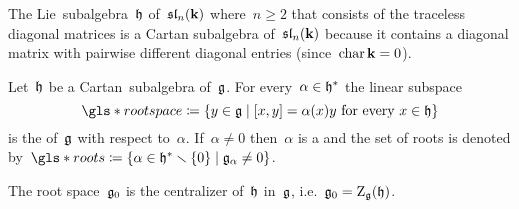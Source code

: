 \begin{example}
  The Lie~subalgebra~$\mathfrak{h}$ of~$\mathfrak{sl}_n(\mathbf{k})$ where~$n \geq 2$ that consists of the traceless diagonal matrices is a Cartan subalgebra of~$\mathfrak{sl}_n(\mathbf{k})$ because it contains a diagonal matrix with pairwise different diagonal entries (since~$\operatorname{char} \mathbf{k} = 0$).
\end{example}


\begin{definition}
  Let~$\mathfrak{h}$ be a Cartan~subalgebra of~$\mathfrak{g}$.
  For every~$\alpha \in \mathfrak{h}^*$ the linear subspace
  \[
    \gls*{root space}
    \defined
    \{
      y \in \glie
    \suchthat
      \text{$[x,y] = \alpha(x)y$ for every~$x \in \hlie$}
    \}
  \]
  is the  of~$\mathfrak{g}$ with respect to~$\alpha$.
  If~$\alpha \neq 0$ then~$\alpha$ is a  and the set of roots is denoted by~$\gls*{roots} \defined \{\alpha \in \hlie^* \smallsetminus \{0\} \suchthat \glie_\alpha \neq 0\}$.
\end{definition}


\begin{remark}
  The root space~$\mathfrak{g}_0$ is the centralizer of~$\mathfrak{h}$ in~$\mathfrak{g}$, i.e.~$\mathfrak{g}_0 = \operatorname{Z}_{\mathfrak{g}}(\mathfrak{h})$.
\end{remark}


